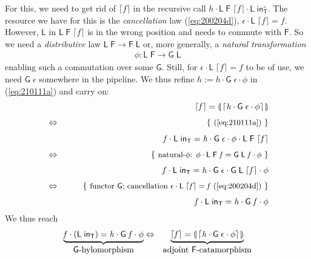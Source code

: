 \documentclass{elsarticle}
\newcommand{\Varid}[1]{\mathit{#1}}
\def\comp{ \mathbin{\cdot} }
\def\conv#1{#1^\circ}
\def\fun#1{\mathsf{#1}}
\def\just#1#2{\\ &#1& \rule{2em}{0pt} \{ \mbox{\rule[-.7em]{0pt}{1.8em} \small #2 \/} \} \nonumber\\ && }
\def\start{&&}
\def\equiv{\Leftrightarrow}
\begin{document}
For this, we need to get rid of \ensuremath{\lceil \Varid{f}\rceil} in the recursive call 
\ensuremath{\Varid{h} \comp \fun L \;\fun F \;\lceil \Varid{f}\rceil \comp \fun L \;\conv{\mathsf{in}_{\fun T}}}.
The resource we have for this is the \emph{cancellation}
law (\ref{eq:200204d}), \ensuremath{\epsilon  \comp \fun L \;\lceil \Varid{f}\rceil\mathrel{=}\Varid{f}}.
However, \ensuremath{\fun L } in \ensuremath{\fun L \;\fun F \;\lceil \Varid{f}\rceil} is in the wrong position and needs to commute with \ensuremath{\fun F }.
So we need a \emph{distributive} law \ensuremath{\fun L \;\fun F \to \fun F \;\fun L } or, more generally, a \emph{natural transformation}
\begin{eqnarray}
	\ensuremath{\phi \mathbin{:}\fun L \;\fun F \to \fun G \;\fun L }
	\label{eq:230209b}
\end{eqnarray}
enabling such a commutation over some \ensuremath{\fun G }. Still, for \ensuremath{\epsilon  \comp \fun L \;\lceil \Varid{f}\rceil\mathrel{=}\Varid{f}} to be of use, we %
need \ensuremath{\fun G \;\epsilon } somewhere in the pipeline.
We thus refine
	\ensuremath{\Varid{h}\mathbin{:=}\Varid{h} \comp \fun G \;\epsilon  \comp \phi }
in (\ref{eq:210111a}) and carry on:
\begin{eqnarray*}
\start
	\ensuremath{\lceil \Varid{f}\rceil\mathrel{=}\llparenthesis\,\lceil \Varid{h} \comp \fun G \;\epsilon  \comp \phi \rceil\,\rrparenthesis}
%
\just\equiv{ (\ref{eq:210111a}) }
%
	\ensuremath{\Varid{f} \comp \fun L \;\mathsf{in}_{\fun T}\mathrel{=}\Varid{h} \comp \fun G \;\epsilon  \comp \phi  \comp \fun L \;\fun F \;\lceil \Varid{f}\rceil}
%
\just\equiv{ natural-\ensuremath{\phi }: \ensuremath{\phi  \comp \fun L \;\fun F \;\Varid{f}\mathrel{=}\fun G \;\fun L \;\Varid{f} \comp \phi } } %
%
	\ensuremath{\Varid{f} \comp \fun L \;\mathsf{in}_{\fun T}\mathrel{=}\Varid{h} \comp \fun G \;\epsilon  \comp \fun G \;\fun L \;\lceil \Varid{f}\rceil \comp \phi }
%
\just\equiv{ functor \ensuremath{\fun G }; cancellation \ensuremath{\epsilon  \comp \fun L \;\lceil \Varid{f}\rceil\mathrel{=}\Varid{f}} (\ref{eq:200204d}) }
%
	\ensuremath{\Varid{f} \comp \fun L \;\mathsf{in}_{\fun T}\mathrel{=}\Varid{h} \comp \fun G \;\Varid{f} \comp \phi }
\end{eqnarray*}
We thus reach 
\begin{eqnarray}
	\underbrace{\ensuremath{\Varid{f} \comp (\fun L \;\mathsf{in}_{\fun T})\mathrel{=}\Varid{h} \comp \fun G \;\Varid{f} \comp \phi }}_{\mbox{\ensuremath{\fun G }-hylomorphism}}
&
	\equiv
&
	\underbrace{\ensuremath{\lceil \Varid{f}\rceil\mathrel{=}\llparenthesis\,\lceil \Varid{h} \comp \fun G \;\epsilon  \comp \phi \rceil\,\rrparenthesis}}_{\mbox{adjoint \ensuremath{\fun F }-catamorphism}}
	\label{eq:200204f}
\end{eqnarray}
\end{document}
